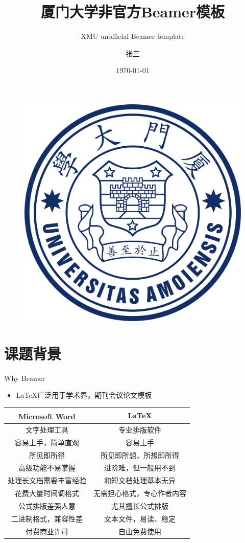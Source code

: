 \documentclass{beamer}
\author[小张]{张三}
\title{厦门大学非官方\textrm{Beamer}模板}
\subtitle{\textrm{XMU unofficial Beamer template}}
\institute{厦门大学XX学院}
\date{\today}
\begin{document}
\begin{frame}
    \titlepage
    \begin{figure}[htpb]
        \begin{center}
            \includegraphics[width=0.2\linewidth]{pic/xmu-logo.pdf}
        \end{center}
    \end{figure}
\end{frame}

\begin{frame}
    \tableofcontents[sectionstyle=show,subsectionstyle=show/shaded/hide,subsubsectionstyle=show/shaded/hide]
\end{frame}


\section{课题背景}

\begin{frame}{Why Beamer}
	\begin{itemize}
		\item \LaTeX 广泛用于学术界，期刊会议论文模板
	\end{itemize}
	\begin{table}[h]
		\centering
		\begin{tabular}{c|c}
			Microsoft\textsuperscript{\textregistered}  Word & \LaTeX \\
			\hline
			文字处理工具 & 专业排版软件 \\
			容易上手，简单直观 & 容易上手 \\
			所见即所得 & 所见即所想，所想即所得 \\
			高级功能不易掌握 & 进阶难，但一般用不到 \\
			处理长文档需要丰富经验 & 和短文档处理基本无异 \\
			花费大量时间调格式 & 无需担心格式，专心作者内容 \\
			公式排版差强人意 & 尤其擅长公式排版 \\
			二进制格式，兼容性差 & 文本文件，易读、稳定 \\
			付费商业许可 & 自由免费使用 \\
		\end{tabular}
	\end{table}
\end{frame}
\end{document}

